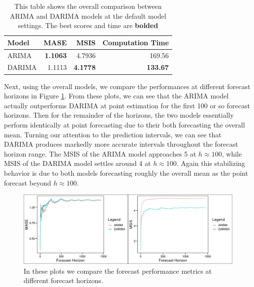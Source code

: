 \documentclass[
]{article}
\begin{document}
\begin{table}
  \begin{center}
    \begin{tabular}[b]{l r r r}
      \hline
      Model & MASE & MSIS & Computation Time \\
      \hline
      ARIMA & \textbf{1.1063} & 4.7936 & 169.56 \\
      DARIMA & 1.1113 & \textbf{4.1778} & \textbf{133.67} \\
      \hline
    \end{tabular}
    \caption{This table shows the overall comparison between ARIMA and DARIMA models at the default model settings. The best scores and time are \textbf{bolded}}
    \label{tab-arima-darima-comp}
  \end{center}
\end{table}

Next, using the overall models, we compare the performances at different forecast horizons in Figure \ref{fig_arima_darima_frct_horizon}. From these plots, we can see that the ARIMA model actually outperforms DARIMA at point estimation for the first 100 or so forecast horizons. Then for the remainder of the horizons, the two models essentially perform identically at point forecasting due to their both forecasting the overall mean. Turning our attention to the prediction intervals, we can see that DARIMA produces markedly more accurate intervals throughout the forecast horizon range. The MSIS of the ARIMA model approaches 5 at $h \approx 100$, while MSIS of the DARIMA model settles around 4 at $h \approx 100$. Again this stabilizing behavior is due to both models forecasting roughly the overall mean as the point forecast beyond $h \approx 100$.

\begin{figure}[ht]
  \begin{center}
    \includegraphics{Plots/arima_darima_forecast_horizon_metrics.png}
    \caption{In these plots we compare the forecast performance metrics at different forecast horizons.}
    \label{fig_arima_darima_frct_horizon}
  \end{center}
\end{figure}
\end{document}
